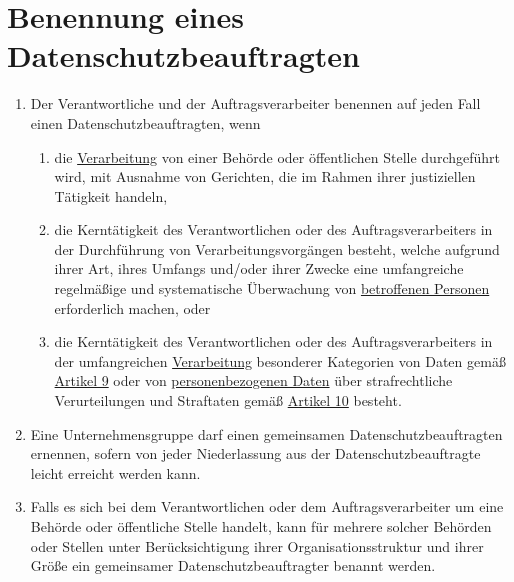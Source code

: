 \chapter{Benennung eines Datenschutzbeauftragten}
\label{ch:37}


\begin{enumerate}

  \item Der Verantwortliche und der Auftragsverarbeiter benennen auf jeden Fall einen Datenschutzbeauftragten, wenn
  \label{itm:37-1}

  \begin{enumerate}
  
    \item die \hyperref[itm:04-2]{Verarbeitung} von einer Behörde oder öffentlichen Stelle durchgeführt wird, mit Ausnahme von Gerichten, die
     im Rahmen ihrer justiziellen Tätigkeit handeln,
    \label{itm:37-1a}

    \item die Kerntätigkeit des Verantwortlichen oder des Auftragsverarbeiters in der Durchführung von
     Verarbeitungsvorgängen besteht, welche aufgrund ihrer Art, ihres Umfangs und/oder ihrer Zwecke eine umfangreiche
     regelmäßige und systematische Überwachung von \hyperref[itm:04-1]{betroffenen Personen} erforderlich machen, oder
    \label{itm:37-1b}

    \item die Kerntätigkeit des Verantwortlichen oder des Auftragsverarbeiters in der umfangreichen \hyperref[itm:04-2]{Verarbeitung}
     besonderer Kategorien von Daten gemäß \hyperref[ch:9]{Artikel 9} oder von \hyperref[itm:04-1]{personenbezogenen Daten} über
     strafrechtliche Verurteilungen und Straftaten gemäß \hyperref[ch:10]{Artikel 10} besteht.
    \label{itm:37-1c}

  \end{enumerate}

  \item Eine Unternehmensgruppe darf einen gemeinsamen Datenschutzbeauftragten ernennen, sofern von jeder Niederlassung
   aus der Datenschutzbeauftragte leicht erreicht werden kann.
  \label{itm:37-2}

  \item Falls es sich bei dem Verantwortlichen oder dem Auftragsverarbeiter um eine Behörde oder öffentliche Stelle
   handelt, kann für mehrere solcher Behörden oder Stellen unter Berücksichtigung ihrer Organisationsstruktur und ihrer
   Größe ein gemeinsamer Datenschutzbeauftragter benannt werden.
  \label{itm:37-3}


\end{enumerate}
